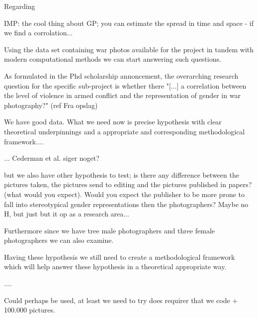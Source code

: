 \documentclass[a4paper]{article}
\begin{document}
Regarding 

IMP: the cool thing about GP; you can estimate the spread in time and space - if we find a corrolation...

Using the data set containing war photos available for the project in tandem with modern computational methods we can start answering such questions.

As formulated in the Phd scholarship annoncement, the overarching research question for the specific sub-project is whether there
"[...] a correlation between the level of violence in armed conflict and the representation of gender in war photography?" (ref Fra opslag)


We have good data. What we need now is precise hypothesis with clear theoretical underpinnings and a appropriate and corresponding methodological framework....

... Cederman et al. siger noget?

but we also have other hypothesis to test; is there any difference between the pictures taken, the pictures send to editing and the pictures published in papers? (what would you expect). Would you expect the publisher to be more prone to fall into stereotypical gender representations then the photographers? Maybe no H, but just but it op as a research area...

Furthermore since we have tree male photographers and three female photographers we can also examine. 

Having these hypothesis we still need to create a methodological framework which will help answer these hypothesis in a theoretical appropriate way.

....

Could perhaps be used, at least we need to try does requirer that we code + 100.000 pictures.
\end{document}
